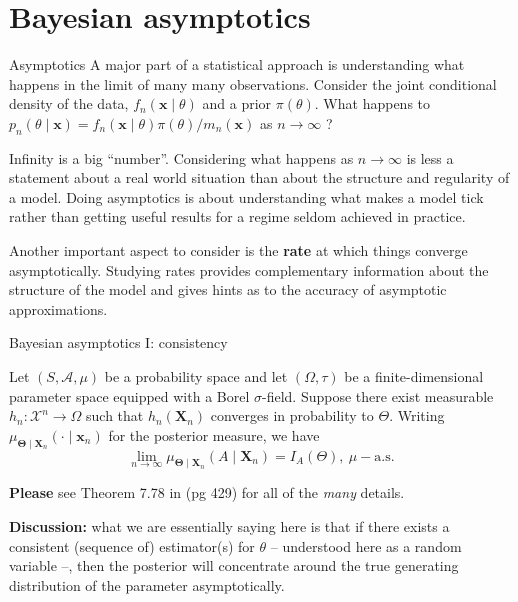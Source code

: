 \section{Bayesian asymptotics}
\begin{frame}{Asymptotics}
A major part of a statistical approach is understanding what happens in the limit of many many observations.
Consider the joint conditional density of the data, $f_n(\boldsymbol{x} \mid \theta)$ and a prior $\pi(\theta)$.
What happens to $p_n(\theta \mid \boldsymbol{x}) = f_n(\boldsymbol{x} \mid \theta)\pi(\theta)/m_n(\boldsymbol{x})$ as $n \to \infty$ ?
\begin{idea}
 Infinity is a big ``number''.
 Considering what happens  as $n \to \infty$ is less a statement about a real world situation than about the structure and regularity of a model.
 Doing asymptotics is about understanding what makes a model tick rather than getting useful results for a regime seldom achieved in practice.
\end{idea}
Another important aspect to consider is the \textbf{rate} at which things converge asymptotically.
Studying rates provides complementary information about the structure of the model and gives hints as to the accuracy of asymptotic approximations.
 \end{frame}
\begin{frame}{Bayesian asymptotics I: consistency}
\begin{theo}
Let $(S, \mathcal{A}, \mu)$ be a probability space and let $(\Omega, \tau)$ be a finite-dimensional parameter space equipped with a Borel $\sigma$-field.
Suppose there exist measurable $h_n: \mathcal{X}^n \to \Omega$ such that $h_n(\boldsymbol{X}_{n})$ converges in probability to $\Theta$.
Writing $\mu_{\boldsymbol{\Theta} \mid \boldsymbol{X}_{n}}(\cdot \mid \boldsymbol{x}_{n})$ for the posterior measure, we have
\begin{equation*}
 \lim_{n \to \infty} \mu_{\boldsymbol{\Theta} \mid \boldsymbol{X}_{n}}(A \mid \boldsymbol{X}_{n}) = I_A(\Theta), \: \mu-\textrm{a.s.}
\end{equation*}
\end{theo}
\textbf{Please} see Theorem 7.78 in \cite{Schervish1995} (pg 429) for all of the \textit{many} details.

\textbf{Discussion:} what we are essentially saying here is that if there exists a consistent (sequence of) estimator(s) for $\theta$ -- understood here as a random variable --, then the posterior will concentrate around the true generating distribution of the parameter asymptotically.
\end{frame}
